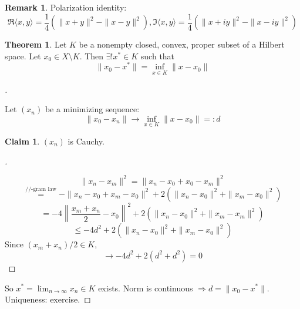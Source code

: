 \documentclass{article}
\theoremstyle{definition}
\newtheorem{thm}{Theorem}
\newtheorem{rem}{Remark}
\newtheorem*{clm}{Claim}
\newenvironment{proofs}[1][\proofname]{%
  \begin{proof}[#1]$ $\par\nobreak\ignorespaces
}{%
  \end{proof}
}
\begin{document}
\begin{rem}
	Polarization identity:
	\[
		\Re \langle x, y \rangle = \frac{1}{4} (\|x + y \|^2 - \|x - y \|^2), \Im \langle x, y \rangle = \frac{1}{4} (\|x + iy\|^2 - \|x - iy \|^2)
	\]
\end{rem}

\begin{thm}
	Let $K$ be a nonempty closed, convex, proper subset of a Hilbert space.
	Let $x_0 \in X \setminus K$.
	Then $\exists ! x^* \in K$ such that
	\[
		\|x_0 - x^*\| = \inf_{x \in K} \|x - x_0\|
	\]
\end{thm}

\begin{proofs}
	Let $(x_n)$ be a minimizing sequence:
	\[
		\|x_0 - x_n\| \to \inf_{x \in K} \|x - x_0\| =: d
	\]
	\begin{clm}
		$(x_n)$ is Cauchy.
	\end{clm}

	\begin{proofs}
		\[
			\|x_n - x_m\|^2 = \|x_n - x_0 + x_0 - x_m\|^2
		\]
		\[
			\stackrel{\text{//-gram law}}{=} - \|x_n - x_0 + x_m - x_0\|^2 + 2 (\|x_n - x_0\|^2 + \|x_m - x_0\|^2)
		\]
		\[
			= -4 \left\| \frac{x_m + x_n}{2} - x_0 \right\|^2 + 2 (\|x_n - x_0\|^2 + \|x_m - x_m\|^2)
		\]
		\[
			\leq -4d^2 + 2(\|x_n - x_0\|^2 + \|x_m - x_0\|^2)
		\]
		Since $(x_m + x_n)/2 \in K$, 
		\[
			\to -4d^2 + 2(d^2 + d^2) = 0
		\]
	\end{proofs}
	So $x^* = \lim_{n \to \infty} x_n \in K$ exists.
	Norm is continuous $\Rightarrow d = \|x_0 - x^*\|$.
	Uniqueness: exercise.
\end{proofs}
\end{document}
